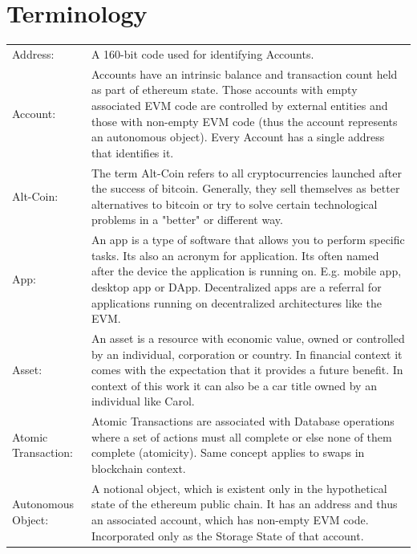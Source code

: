 
\chapter{Terminology}
\label{ch:chapter06}

\begin{center}
	\begin{tabular}{ p{4cm} p{8cm} } 
		Address: & A 160-bit code used for identifying Accounts.  \\ 
		Account: & Accounts have an intrinsic balance and transaction count held as part of ethereum state. Those accounts with empty associated \ac{EVM} code are controlled by external entities and those with non-empty \ac{EVM} code (thus the account represents an autonomous object). Every Account has a single address that identifies it. \\
		Alt-Coin: & The term Alt-Coin refers to all cryptocurrencies launched after the success of bitcoin. Generally, they sell themselves as better alternatives to bitcoin or try to solve certain technological problems in a "better" or different way. \\
		App: & An app is a type of software that allows you to perform specific tasks. Its also an acronym for application. Its often named after the device the application is running on. E.g. mobile app, desktop app or \ac{DApp}. Decentralized apps are a referral for applications running on decentralized architectures like the \ac{EVM}. \\
		Asset: & An asset is a resource with economic value, owned or controlled by an individual, corporation or country. In financial context it comes with the expectation that it provides a future benefit. In context of this work it can also be a car title owned by an individual like Carol.\\
		Atomic Transaction: & Atomic Transactions are associated with Database operations where a set of actions must all complete or else none of them complete (atomicity). Same concept applies to swaps in blockchain context. \\
		Autonomous Object: & A notional object, which is existent only in the hypothetical state of the ethereum public chain. It has an address and thus an associated account, which has non-empty \ac{EVM} code. Incorporated only as the Storage State of that account. \\
	\end{tabular}
\end{center}

